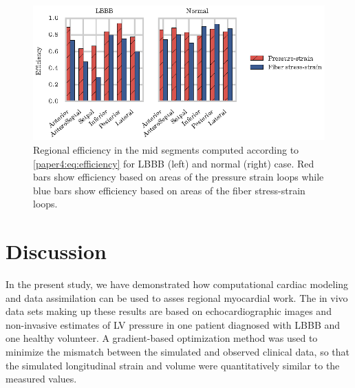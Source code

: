 \begin{figure}[htbp]
  \centering
  \includegraphics{figures/regional_work_indices}
  \caption{\label{paper4:fig:regional_work_indices} Regional efficiency in
    the mid segments computed according to \eqref{paper4:eq:efficiency} for LBBB (left) and normal (right)
    case. Red bars show efficiency based on areas of the pressure
    strain loops while blue bars show efficiency based on areas of the
    fiber stress-strain loops.}
\end{figure}


% 
\section{Discussion}
In the present study, we have demonstrated how computational cardiac
modeling and data assimilation can be used to asses regional
myocardial work. The in vivo data sets making up these results are
based on echocardiographic images and non-invasive estimates of LV
pressure in one patient diagnosed with LBBB and one healthy volunteer. 
A gradient-based optimization method was used to minimize the mismatch
between the simulated and observed clinical data, so that the simulated
longitudinal strain and volume were quantitatively similar to the
measured values.




